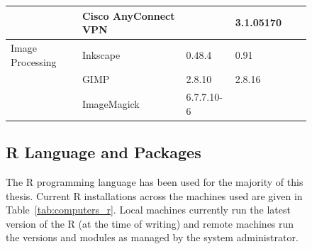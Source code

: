 \begin{figure}[!htp]
\begin{table}[!ht]
{\begin{tabular}{|ll|l|l|l|l|}
\rowcolor{black!10}
\cellcolor{white}                                                      & \multicolumn{1}{|l|}{Cisco AnyConnect VPN}   &                                                                     & 3.1.05170                                                         &                                                                        &                                                \\
\hline
\rowcolor{black!5}
\cellcolor{white} Image Processing                                     & \multicolumn{1}{|l|}{Inkscape}               & 0.48.4                                                              & 0.91                                                              &                                                                        &                                                \\
\rowcolor{black!10}
\cellcolor{white}                                                      & \multicolumn{1}{|l|}{GIMP}                   & 2.8.10                                                              & 2.8.16                                                            &                                                                        &                                                \\
\rowcolor{black!5}
\cellcolor{white}                                                      & \multicolumn{1}{|l|}{ImageMagick}            & 6.7.7.10-6                                                          &                                                                   &                                                                        &                                                \\
\hline                                
\end{tabular}
}
\end{table}


\FloatBarrier

\subsection{R Language and Packages}


The R programming language has been used for the majority of this thesis. Current R installations across the machines used are given in Table~\ref{tab:computers_r}. Local machines currently run the latest version of the R (at the time of writing) and remote machines run the versions and modules as managed by the system administrator.


\end{figure}
